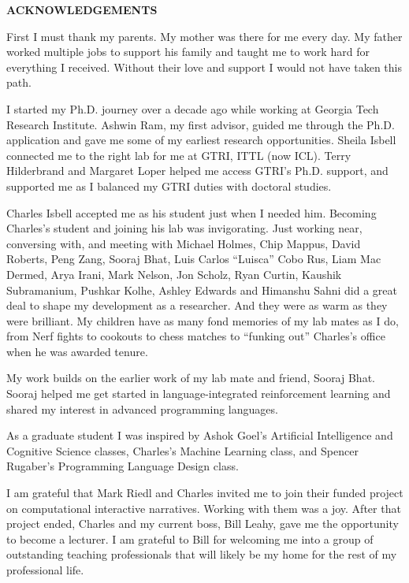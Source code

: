 \clearpage
\begin{centering}
\textbf{ACKNOWLEDGEMENTS}\\
\vspace{\baselineskip}
\end{centering}


First I must thank my parents. My mother was there for me every day. My father worked multiple jobs to support his family and taught me to work hard for everything I received. Without their love and support I would not have taken this path.

I started my Ph.D. journey over a decade ago while working at Georgia Tech Research Institute. Ashwin Ram, my first advisor, guided me through the Ph.D. application and gave me some of my earliest research opportunities. Sheila Isbell connected me to the right lab for me at GTRI, ITTL (now ICL). Terry Hilderbrand and Margaret Loper helped me access GTRI's Ph.D. support, and supported me as I balanced my GTRI duties with doctoral studies.

Charles Isbell accepted me as his student just when I needed him. Becoming Charles's student and joining his lab was invigorating. Just working near, conversing with, and meeting with Michael Holmes, Chip Mappus, David Roberts, Peng Zang, Sooraj Bhat, Luis Carlos ``Luisca'' Cobo Rus, Liam Mac Dermed, Arya Irani, Mark Nelson, Jon Scholz, Ryan Curtin, Kaushik Subramanium, Pushkar Kolhe, Ashley Edwards and Himanshu Sahni did a great deal to shape my development as a researcher.  And they were as warm as they were brilliant. My children have as many fond memories of my lab mates as I do, from Nerf fights to cookouts to chess matches to ``funking out'' Charles's office when he was awarded tenure.

My work builds on the earlier work of my lab mate and friend, Sooraj Bhat. Sooraj helped me get started in language-integrated reinforcement learning and shared my interest in advanced programming languages.

As a graduate student I was inspired by Ashok Goel's Artificial Intelligence and Cognitive Science classes, Charles's Machine Learning class, and Spencer Rugaber's Programming Language Design class.

\newpage

I am grateful that Mark Riedl and Charles invited me to join their funded project on computational interactive narratives. Working with them was a joy. After that project ended, Charles and my current boss, Bill Leahy, gave me the opportunity to become a lecturer. I am grateful to Bill for welcoming me into a group of outstanding teaching professionals that will likely be my home for the rest of my professional life.

